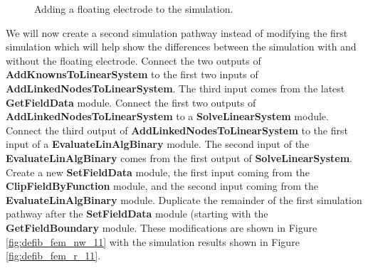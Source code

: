 \documentclass[fleqn,11pt,openany]{book}
\begin{document}
\begin{figure}
\caption{Adding a floating electrode to the
simulation.}\label{fig:defib_fem_nw_10}
\end{figure}

We will now create a second simulation pathway instead of modifying
the first simulation which will help show the differences between the
simulation with and without the floating electrode. Connect the two
outputs of {\bf AddKnownsToLinearSystem} to the first two inputs of
{\bf AddLinkedNodesToLinearSystem}. The third input comes from the
latest {\bf GetFieldData} module. Connect the first two outputs of
{\bf AddLinkedNodesToLinearSystem} to a {\bf SolveLinearSystem}
module. Connect the third output of {\bf AddLinkedNodesToLinearSystem}
to the first input of a {\bf EvaluateLinAlgBinary} module. The second
input of the {\bf EvaluateLinAlgBinary} comes from the first output of
{\bf SolveLinearSystem}. Create a new {\bf SetFieldData} module, the
first input coming from the {\bf ClipFieldByFunction} module, and the
second input coming from the {\bf EvaluateLinAlgBinary}
module. Duplicate the remainder of the first simulation pathway after
the {\bf SetFieldData} module (starting with the {\bf
GetFieldBoundary} module. These modifications are shown in Figure
\ref{fig:defib_fem_nw_11} with the simulation results shown in Figure
\ref{fig:defib_fem_r_11}.
\end{document}
